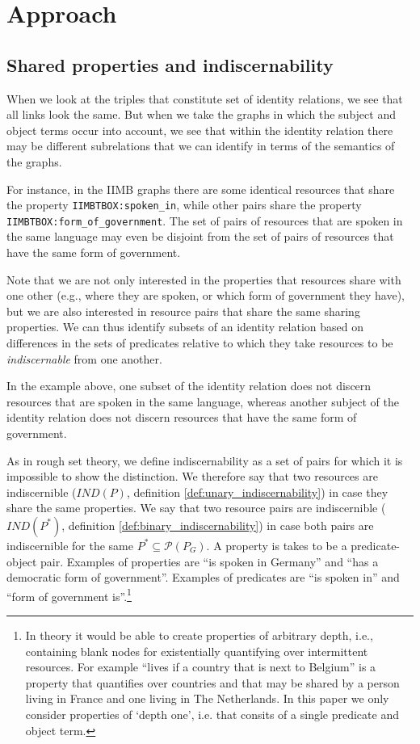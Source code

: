 \documentclass[letterpaper]{article}
\begin{document}
\section{Approach}

\subsection{Shared properties and indiscernability}
\label{sec:indiscernibility}

When we look at the triples that constitute set of identity relations, we see that all links look the same. But when we take the graphs in which the subject and object terms occur into account, we see that within the identity relation there may be different subrelations that we can identify in terms of the semantics of the graphs.

For instance, in the IIMB graphs there are some identical resources that share the property \verb|IIMBTBOX:spoken_in|, while other pairs share the property \verb|IIMBTBOX:form_of_government|. The set of pairs of resources that are spoken in the same language may even be disjoint from the set of pairs of resources that have the same form of government.

Note that we are not only interested in the properties that resources share with one other (e.g., where they are spoken, or which form of government they have), but we are also interested in resource pairs that share the same sharing properties. We can thus identify subsets of an identity relation based on differences in the sets of predicates relative to which they take resources to be \emph{indiscernable} from one another.

In the example above, one subset of the identity relation does not discern resources that are spoken in the same language, whereas another subject of the identity relation does not discern resources that have the same form of government.

As in rough set theory, we define indiscernability as a set of pairs for which it is impossible to show the distinction. We therefore say that two resources are indiscernible ($IND(P)$, definition \ref{def:unary_indiscernability}) in case they share the same properties. We say that two resource pairs are indiscernible ($IND(P^*)$, definition \ref{def:binary_indiscernability}) in case both pairs are indiscernible for the same $P^* \subseteq \mathcal{P}(P_G)$. A property is takes to be a predicate-object pair. Examples of properties are ``is spoken in Germany'' and ``has a democratic form of government''. Examples of predicates are ``is spoken in'' and ``form of government is''.\footnote{In theory it would be able to create properties of arbitrary depth, i.e., containing blank nodes for existentially quantifying over intermittent resources. For example ``lives if a country that is next to Belgium'' is a property that quantifies over countries and that may be shared by a person living in France and one living in The Netherlands. In this paper we only consider properties of `depth one', i.e. that consits of a single predicate and object term.}
\end{document}
